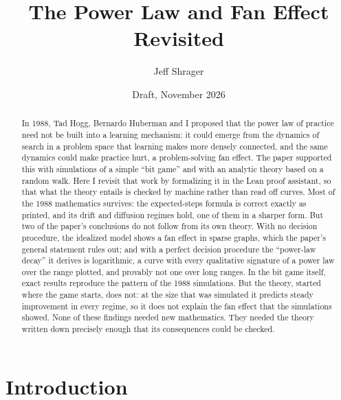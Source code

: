 \documentclass[11pt]{article}
\title{The Power Law and Fan Effect Revisited}
\author{Jeff Shrager}
\date{Draft, November 2026}
\begin{document}
\sloppy
\maketitle

\begin{center}
\end{center}
\medskip

\begin{abstract}
In 1988, Tad Hogg, Bernardo Huberman and I proposed that the power law of
practice need not be built into a learning mechanism: it could emerge from
the dynamics of search in a problem space that learning makes more densely
connected, and the same dynamics could make practice hurt, a
problem-solving fan effect. The paper supported this with simulations of a
simple ``bit game'' and with an analytic theory based on a random walk.
Here I revisit that work by formalizing it in the Lean proof assistant, so
that what the theory entails is checked by machine rather than read off
curves. Most of the 1988 mathematics survives: the expected-steps formula
is correct exactly as printed, and its drift and diffusion regimes hold,
one of them in a sharper form. But two of the paper's conclusions do not
follow from its own theory. With no decision procedure, the idealized
model shows a fan effect in sparse graphs, which the paper's general
statement rules out; and with a perfect
decision procedure the ``power-law decay'' it derives is logarithmic, a
curve with every qualitative signature of a power law over the range
plotted, and provably not one over long ranges. In the bit game itself,
exact results reproduce the pattern of the 1988 simulations. But the
theory, started where the game starts, does not: at the size that was
simulated it predicts steady improvement in every regime, so it does not
explain the fan effect that the simulations showed. None of these findings
needed new
mathematics. They needed the theory written down precisely enough that its
consequences could be checked.
\end{abstract}

\section{Introduction}
\label{sec:intro}
\end{document}
